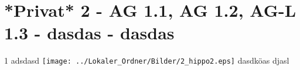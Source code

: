 \section{*Privat* 2 - AG 1.1, AG 1.2, AG-L 1.3 - dasdas - dasdas}

\begin{langesbeispiel} \item[1] %
adsdasd
\texttt{[image: ../Lokaler\_Ordner/Bilder/2\_hippo2.eps]}
dasdköas
djasl

\end{langesbeispiel}